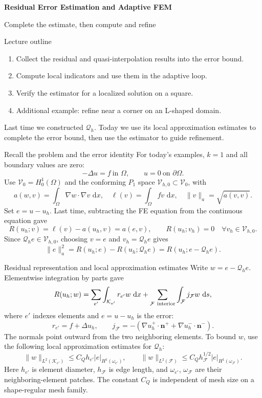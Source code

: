 \documentclass[11pt,aspectratio=169]{beamer}
\newcommand{\dd}{\,\mathrm d}
\newcommand{\Om}{\Omega}
\newcommand{\Vzero}{\mathcal V_0}
\newcommand{\Vhzero}{\mathcal V_{h,0}}
\newcommand{\Qh}{\mathcal Q_h}
\newcommand{\grad}{\nabla}
\newcommand{\norm}[2][]{\lVert#2\rVert_{#1}}
\newcommand{\seminorm}[2][]{\lvert#2\rvert_{#1}}
\begin{document}
\begin{frame}
\centering\vfill
{\LARGE\bfseries Residual Error Estimation and Adaptive FEM\par}
\vspace{0.4cm}
{\large Complete the estimate, then compute and refine\par}
\vfill
\end{frame}

\begin{frame}{Lecture outline}
\begin{enumerate}
\item Collect the residual and quasi-interpolation results into the error bound.
\item Compute local indicators and use them in the adaptive loop.
\item Verify the estimator for a localized solution on a square.
\item Additional example: refine near a corner on an L-shaped domain.
\end{enumerate}
Last time we constructed $\Qh$. Today we use its local approximation estimates
to complete the error bound, then use the estimator to guide refinement.
\end{frame}

\begin{frame}{Recall the problem and the error identity}
For today's examples, $k=1$ and all boundary values are zero:
\[
-\Delta u=f\ \text{in }\Om,\qquad u=0\ \text{on }\partial\Om.
\]
Use $\Vzero=H^1_0(\Om)$ and the conforming $P_1$ space $\Vhzero\subset\Vzero$,
with
\[
a(w,v)=\int_\Om\grad w\cdot\grad v\,\dd x,\quad
\ell(v)=\int_\Om fv\,\dd x,\quad \norm[a]{v}=\sqrt{a(v,v)}.
\]
Set $e=u-u_h$. Last time, subtracting the FE equation from the continuous
equation gave
\[
R(u_h;v)=\ell(v)-a(u_h,v)=a(e,v),\qquad
R(u_h;v_h)=0\quad\forall v_h\in\Vhzero.
\]
Since $\Qh e\in\Vhzero$, choosing $v=e$ and $v_h=\Qh e$ gives
\[
\boxed{\norm[a]{e}^2=R(u_h;e)-R(u_h;\Qh e)=R(u_h;e-\Qh e).}
\]
\end{frame}

\begin{frame}{Residual representation and local approximation estimates}
Write $w=e-\Qh e$. Elementwise integration by parts gave
\[
R(u_h;w)=\sum_{e'}\int_{\mathcal K_{e'}}r_{e'}w\,\dd x
+\sum_{\mathcal F\ {\rm interior}}\int_{\mathcal F}j_{\mathcal F}w\,\dd s,
\]
where $e'$ indexes elements and $e=u-u_h$ is the error:
\[
r_{e'}=f+\Delta u_h,\qquad
j_{\mathcal F}=-(\grad u_h^+\cdot\bm n^+
                         +\grad u_h^-\cdot\bm n^-).
\]
The normals point outward from the two neighboring elements.
To bound $w$, use the following local approximation estimates for $\Qh$:
\[
\norm[L^2(\mathcal K_{e'})]{w}
 \le C_Q h_{e'}\seminorm[H^1(\omega_{e'})]{e},\qquad
\norm[L^2(\mathcal F)]{w}
 \le C_Q h_{\mathcal F}^{1/2}\seminorm[H^1(\omega_{\mathcal F})]{e}.
\]
Here $h_{e'}$ is element diameter, $h_{\mathcal F}$ is edge length, and
$\omega_{e'}$, $\omega_{\mathcal F}$ are their neighboring-element patches.
The constant $C_Q$ is independent of mesh size on a shape-regular mesh family.
\end{frame}
\end{document}
